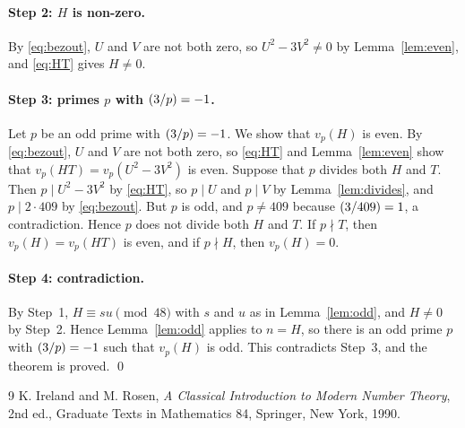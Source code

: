 \documentclass[11pt]{article}
\newcommand{\leg}[2]{\mathchoice{\biggl(\dfrac{#1}{#2}\biggr)}{(#1/#2)}{(#1/#2)}{(#1/#2)}}
\begin{document}
\paragraph{Step 2: $H$ is non-zero.} By \eqref{eq:bezout}, $U$ and $V$ are not both zero, so $U^2-3V^2\neq0$ by Lemma~\ref{lem:even}, and \eqref{eq:HT} gives $H\neq0$.

\paragraph{\texorpdfstring{Step 3: primes $p$ with $\leg{3}{p}=-1$.}{Step 3: inert primes.}} Let $p$ be an odd prime with $\leg{3}{p}=-1$. We show that $v_p(H)$ is even. By \eqref{eq:bezout}, $U$ and $V$ are not both zero, so \eqref{eq:HT} and Lemma~\ref{lem:even} show that $v_p(HT)=v_p(U^2-3V^2)$ is even. Suppose that $p$ divides both $H$ and $T$. Then $p\mid U^2-3V^2$ by \eqref{eq:HT}, so $p\mid U$ and $p\mid V$ by Lemma~\ref{lem:divides}, and $p\mid 2\cdot 409$ by \eqref{eq:bezout}. But $p$ is odd, and $p\neq409$ because $\leg{3}{409}=1$, a contradiction. Hence $p$ does not divide both $H$ and $T$. If $p\nmid T$, then $v_p(H)=v_p(HT)$ is even, and if $p\nmid H$, then $v_p(H)=0$.

\paragraph{Step 4: contradiction.} By Step~1, $H\equiv su\pmod{48}$ with $s$ and $u$ as in Lemma~\ref{lem:odd}, and $H\neq0$ by Step~2. Hence Lemma~\ref{lem:odd} applies to $n=H$, so there is an odd prime $p$ with $\leg{3}{p}=-1$ such that $v_p(H)$ is odd. This contradicts Step~3, and the theorem is proved.
\qed

\begin{thebibliography}{9}
 K. Ireland and M. Rosen, \emph{A Classical Introduction to Modern Number Theory}, 2nd ed., Graduate Texts in Mathematics 84, Springer, New York, 1990.
\end{thebibliography}
\end{document}
